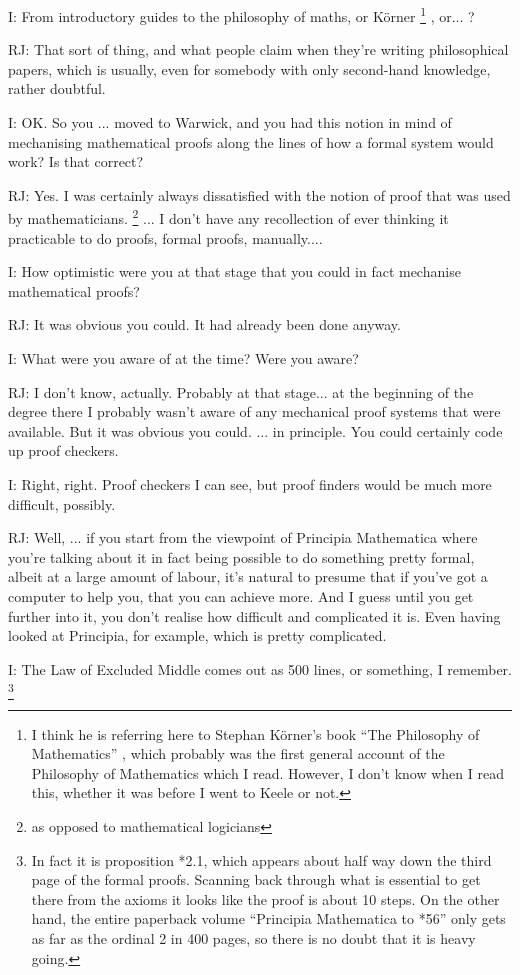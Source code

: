 \documentclass[10pt,titlepage]{book}
\begin{document}
I: From introductory guides to the philosophy of maths, or K\"orner%
\footnote{I think he is referring here to Stephan K\"orner's book ``The Philosophy of Mathematics'' \cite{korner1960}, which probably was the first general account of the Philosophy of Mathematics which I read.
However, I don't know when I read this, whether it was before I went to Keele or not.
}%
, or... ?

RJ: That sort of thing, and what people claim when they're writing philosophical papers, which is usually, even for somebody with only second-hand knowledge, rather doubtful.

I: OK. So you ... moved to Warwick, and you had this notion in mind of mechanising mathematical proofs along the lines of how a formal system would work?
Is that correct?

RJ: Yes.
I was certainly always dissatisfied with the notion of proof that was used by mathematicians.%
\footnote{
as opposed to mathematical logicians}%
... I don't have any recollection of ever thinking it practicable to do proofs, formal proofs, manually....

I: How optimistic were you at that stage that you could in fact mechanise mathematical proofs?

RJ: It was obvious you could.
It had already been done anyway.

I: What were you aware of at the time?
Were you aware?

RJ: I don't know, actually.
Probably at that stage... at the beginning of the degree there I probably wasn't aware of any mechanical proof systems that were available.
But it was obvious you could.
... in principle.
You could certainly code up proof checkers.

I: Right, right.
Proof checkers I can see, but proof finders would be much more difficult, possibly.

RJ: Well, ...  if you start from the viewpoint of Principia Mathematica where you're talking about it in fact being possible to do something pretty formal, albeit at a large amount of labour, it's natural to presume that if you've got a computer to help you, that you can achieve more.
And I guess until you get further into it, you don't realise how difficult and complicated it is.
Even having looked at Principia, for example, which is pretty complicated.

I: The Law of Excluded Middle comes out as 500 lines, or something, I remember.%
\footnote{
In fact it is proposition *2.1, which appears about half way down the third page of the formal proofs.
Scanning back through what is essential to get there from the axioms it looks like the proof is about 10 steps.
On the other hand, the entire paperback volume ``Principia Mathematica to *56''\cite{russell1970} only gets as far as the ordinal 2 in 400 pages, so there is no doubt that it is heavy going.
}
\end{document}
